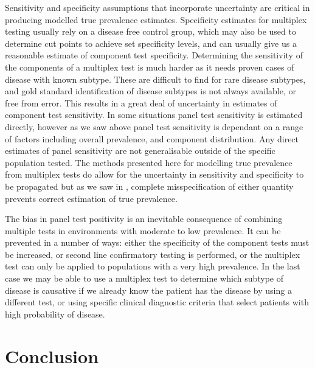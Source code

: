 \documentclass[10pt,letterpaper]{article}
\begin{document}
Sensitivity and specificity assumptions that incorporate uncertainty are critical in producing modelled true prevalence estimates. Specificity estimates for multiplex testing usually rely on a disease free control group, which may also be used to determine cut points to achieve set specificity levels, and can usually give us a reasonable estimate of component test specificity. Determining the sensitivity of the components of a multiplex test is much harder as it needs proven cases of disease with known subtype. These are difficult to find for rare disease subtypes, and gold standard identification of disease subtypes is not always available, or free from error\cite{loeffelholz2020,leber2018}. This results in a great deal of uncertainty in estimates of component test sensitivity. In some situations panel test sensitivity is estimated directly, however as we saw above panel test sensitivity is dependant on a range of factors including overall prevalence, and component distribution. Any direct estimates of panel sensitivity are not generalisable outside of the specific population tested. The methods presented here for modelling true prevalence from multiplex tests do allow for the uncertainty in sensitivity and specificity to be propagated but as we saw in , complete misspecification of either quantity prevents correct estimation of true prevalence.

The bias in panel test positivity is an inevitable consequence of combining multiple tests in environments with moderate to low prevalence. It can be prevented in a number of ways: either the specificity of the component tests must be increased, or second line confirmatory testing is performed, or the multiplex test can only be applied to populations with a very high prevalence. In the last case we may be able to use a multiplex test to determine which subtype of disease is causative if we already know the patient has the disease by using a different test, or using specific clinical diagnostic criteria that select patients with high probability of disease.

\section*{Conclusion}
\end{document}
